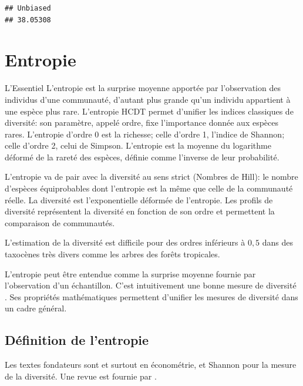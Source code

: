 \documentclass[
  11pt,
  french,
  a4paper,
  extrafontsizes,onecolumn,openright
  ]{memoir}
\newenvironment{Summary}
  {\begin{bclogo}[logo=\bctrombone, noborder=true, couleur=lightgray!50]{L'Essentiel}\parindent0pt}
  {\end{bclogo}}
\begin{document}
\begin{verbatim}
## Unbiased 
## 38.05308
\end{verbatim}

\normalsize

\hypertarget{entropie}{%
\chapter{Entropie}\label{entropie}}

\scriptsize

\begin{Summary}
L'entropie est la surprise moyenne apportée par l'observation des
individus d'une communauté, d'autant plus grande qu'un individu
appartient à une espèce plus rare. L'entropie HCDT permet d'unifier les
indices classiques de diversité: son paramètre, appelé ordre, fixe
l'importance donnée aux espèces rares. L'entropie d'ordre 0 est la
richesse; celle d'ordre 1, l'indice de Shannon; celle d'ordre 2, celui
de Simpson. L'entropie est la moyenne du logarithme déformé de la rareté
des espèces, définie comme l'inverse de leur probabilité.

L'entropie va de pair avec la diversité au sens strict (Nombres de
Hill): le nombre d'espèces équiprobables dont l'entropie est la même que
celle de la communauté réelle. La diversité est l'exponentielle déformée
de l'entropie. Les profils de diversité représentent la diversité en
fonction de son ordre et permettent la comparaison de communautés.

L'estimation de la diversité est difficile pour des ordres inférieurs à
\(0,5\) dans des taxocènes très divers comme les arbres des forêts
tropicales.
\end{Summary}

\normalsize

L'entropie peut être entendue comme la surprise moyenne fournie par l'observation d'un échantillon.
C'est intuitivement une bonne mesure de diversité \autocite{Pielou1975}.
Ses propriétés mathématiques permettent d'unifier les mesures de diversité dans un cadre général.

\hypertarget{duxe9finition-de-lentropie}{%
\section{Définition de l'entropie}\label{duxe9finition-de-lentropie}}

Les textes fondateurs sont \textcite{Davis1941} et surtout \textcite{Theil1967} en économétrie, et Shannon \autocite*{Shannon1948,Shannon1963} pour la mesure de la diversité.
Une revue est fournie par \textcite{Maasoumi1993}.
\end{document}

